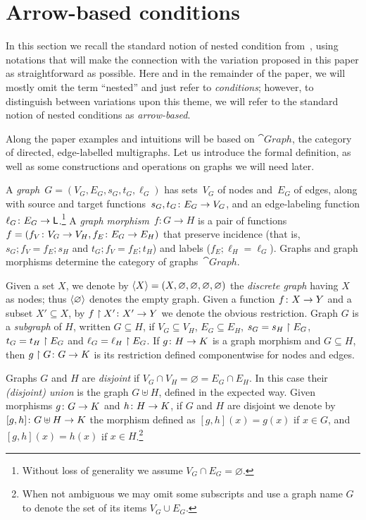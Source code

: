 \section{Arrow-based conditions}

In this section we recall the standard notion of nested condition from~\cite{Rensink-FOL}, using notations that will make the connection with the variation proposed in this paper as straightforward as possible. Here and in the remainder of the paper, we will mostly omit the term ``nested'' and just refer to \emph{conditions}; however, to distinguish between variations upon this theme, we will refer to the standard notion of nested conditions as \emph{arrow-based}.

Along the paper examples and intuitions will be based on $\cat{Graph}$, the category of directed, edge-labelled multigraphs. Let us introduce the formal definition, as well as some constructions and operations on graphs we will need later.

\begin{definition}\label{def:graph-and-morphism}
  A \emph{graph}~$G = (V_G,E_G,s_G,t_G,\ell_G)$ has sets~$V_G$ of nodes and~$E_G$ of edges, along with source and target functions~$s_G,t_G\colon E_G\rightarrow V_G$, and an edge-labeling function $\ell_G\colon E_G \rightarrow \mathsf{L}$.\footnote{Without loss of generality we assume $V_G \cap E_G= \varnothing$.}
  A \emph{graph morphism}~$f:G\to H$ is a pair of functions~$f = (f_V\colon V_G\rightarrow V_H, f_E\colon E_G\rightarrow E_H)$ that preserve incidence (that is, $s_G; f_V = f_E;s_H$ and $t_G; f_V = f_E ; t_H$) and labels ($f_E;\ell_H = \ell_G$).
  Graphs and graph morphisms determine the category of graphs~$\cat{Graph}$.

  Given a set $X$, we denote by $\langle X \rangle = (X,\varnothing,\varnothing,\varnothing,\varnothing)$ the \emph{discrete graph} having $X$ as nodes; thus $\langle \varnothing \rangle$ denotes the empty graph. Given a function $f\colon X \rightarrow Y$ and a subset $X' \subseteq X$, by $f\restriction X'\colon X' \rightarrow Y$ we denote the obvious restriction. Graph $G$ is a \emph{subgraph} of $H$, written $G \subseteq H$, if $V_G \subseteq V_H$, $E_G \subseteq E_H$, $s_G = s_H\restriction E_G$, $t_G = t_H\restriction E_G$ and $\ell_G = \ell_H\restriction E_G$. If $g \colon H \rightarrow K$ is a graph morphism and $G \subseteq H$, then $g \restriction G \colon G \rightarrow K$ is its restriction defined componentwise for nodes and edges.  


  Graphs $G$ and $H$ are \emph{disjoint} if $V_G \cap V_H = \varnothing = E_G \cap E_H$. In this case their \emph{(disjoint) union} is the graph $G \uplus H$, defined in the expected way. Given morphisms $g\colon G \rightarrow K$ and $h \colon H \rightarrow K$, if $G$ and $H$ are disjoint we denote by $[g,h]\colon G\uplus H \rightarrow K$ the morphism defined as $[g,h](x) = g(x)$ if $x \in G$, and $[g,h](x) = h(x)$ if $x \in H$.\footnote{When not ambiguous we may omit some subscripts and use a graph name $G$ to denote the set of its items $V_G \cup E_G$.}
\end{definition}

